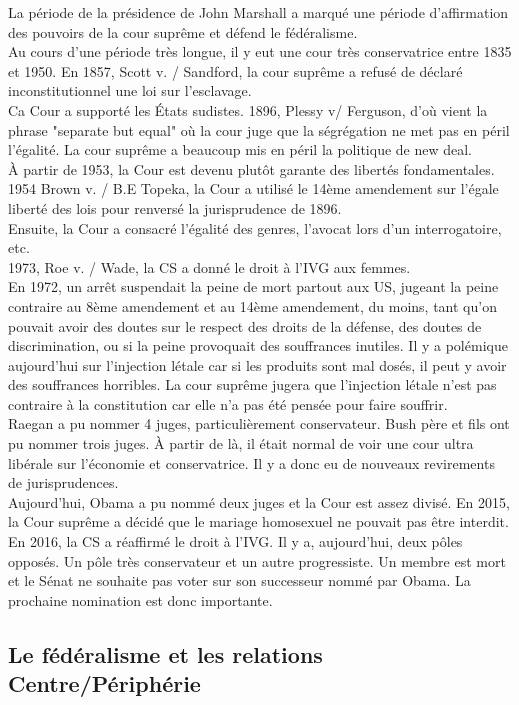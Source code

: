 \documentclass[10pt, a4paper, openany]{book}
\begin{document}
La période de la présidence de John Marshall a marqué une période d'affirmation des pouvoirs de la cour suprême et défend le fédéralisme. \\
Au cours d'une période très longue, il y eut une cour très conservatrice entre 1835 et 1950. En 1857, Scott v. / Sandford, la cour suprême a refusé de déclaré inconstitutionnel une loi sur l'esclavage. \\
Ca Cour a supporté les États sudistes. 1896, Plessy v/ Ferguson, d'où vient la phrase "separate but equal" où la cour juge que la ségrégation ne met pas en péril l'égalité. La cour suprême a beaucoup mis en péril la politique de new deal. \\
À partir de 1953, la Cour est devenu plutôt garante des libertés fondamentales. 1954 Brown v. / B.E Topeka, la Cour a utilisé le 14ème amendement sur l'égale liberté des lois pour renversé la jurisprudence de 1896. \\
Ensuite, la Cour a consacré l'égalité des genres, l'avocat lors d'un interrogatoire, etc. \\
1973, Roe v. / Wade, la CS a donné le droit à l'IVG aux femmes. \\
En 1972, un arrêt suspendait la peine de mort partout aux US, jugeant la peine contraire au 8ème amendement et au 14ème amendement, du moins, tant qu'on pouvait avoir des doutes sur le respect des droits de la défense, des doutes de discrimination, ou si la peine provoquait des souffrances inutiles. Il y a polémique aujourd'hui sur l'injection létale car si les produits sont mal dosés, il peut y avoir des souffrances horribles. La cour suprême jugera que l'injection létale n'est pas contraire à la constitution car elle n'a pas été pensée pour faire souffrir. \\
Raegan a pu nommer 4 juges, particulièrement conservateur. Bush père et fils ont pu nommer trois juges. À partir de là, il était normal de voir une cour ultra libérale sur l'économie et conservatrice. Il y a donc eu de nouveaux revirements de jurisprudences. \\
Aujourd'hui, Obama a pu nommé deux juges et la Cour est assez divisé. En 2015, la Cour suprême a décidé que le mariage homosexuel ne pouvait pas être interdit. En 2016, la CS a réaffirmé le droit à l'IVG. Il y a, aujourd'hui, deux pôles opposés. Un pôle très conservateur et un autre progressiste. Un membre est mort et le Sénat ne souhaite pas voter sur son successeur nommé par Obama. La prochaine nomination est donc importante. 

\subsection{Le fédéralisme et les relations Centre/Périphérie}
\end{document}
